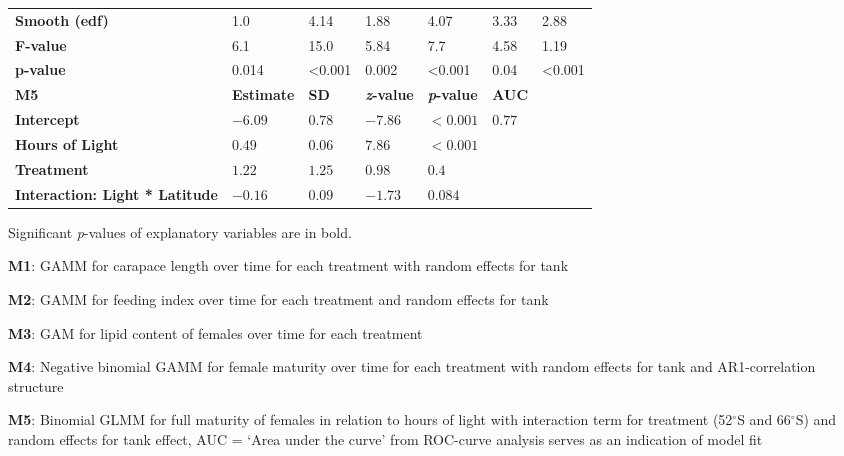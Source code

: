\begin{table}[]
{\begin{tabular}{@{}lllllll@{}}
\textbf{Smooth (edf)} & \cellcolor{gray!50}1.0 & \cellcolor{gray!50}4.14 &\cellcolor{blue!25}1.88 & \cellcolor{blue!25}4.07 & \cellcolor{blue!50}3.33 & \cellcolor{blue!50}2.88 \\

\textbf{F-value} & \cellcolor{gray!50}6.1 & \cellcolor{gray!50}15.0 &\cellcolor{blue!25}5.84 & \cellcolor{blue!25}7.7 & \cellcolor{blue!50}4.58 & \cellcolor{blue!50}1.19 \\

\textbf{p-value} & \cellcolor{gray!50}0.014 & \cellcolor{gray!50}<0.001 &\cellcolor{blue!25}0.002 & \cellcolor{blue!25}<0.001 & \cellcolor{blue!50}0.04 & \cellcolor{blue!50}<0.001 \\
\midrule
\textbf{M5} & \textbf{Estimate} & \textbf{SD} & \textbf{\textit{z}-value} & \textbf{\textit{p}-value} &  \textbf{AUC} & \\
\textbf{Intercept} & $-6.09$ & $0.78$ & $-7.86$ & $<0.001$ & $0.77$ & \\
\textbf{Hours of Light} & $0.49$ & $0.06$ & $7.86$ & $<0.001$ & & \\
\textbf{Treatment} & $1.22$ & $1.25$ & $0.98$ & $0.4$ & & \\
\textbf{Interaction: Light * Latitude} & $-0.16$ & $0.09$ & $-1.73$ & $0.084$ & & \\

\bottomrule
\end{tabular}
    \begin{tablenotes}
      \item Significant \textit{p}-values of explanatory variables are in bold.
      \item \textbf{M1}: GAMM for carapace length over time for each treatment with random effects for tank
      \item \textbf{M2}: GAMM for feeding index over time for each treatment and random effects for tank
      \item \textbf{M3}: GAM for lipid content of females over time for each treatment 
      \item \textbf{M4}: Negative binomial GAMM for female maturity over time for each treatment with random effects for tank and AR1-correlation structure
      \item \textbf{M5}: Binomial GLMM for full maturity of females in relation to hours of light with interaction term for treatment (52$^{\circ}$S and 66$^{\circ}$S) and random effects for tank effect, AUC = ‘Area under the curve’ from ROC-curve analysis serves as an indication of model fit
    \end{tablenotes}
}
\end{table}
